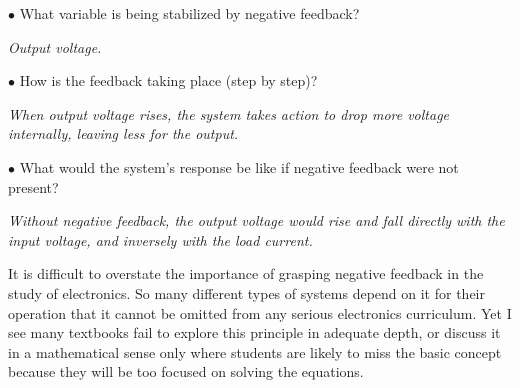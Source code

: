 \medskip
\goodbreak
\item{$\bullet$} What variable is being stabilized by negative feedback? 
\item{ }{\it Output voltage.}
\vskip 5pt
\item{$\bullet$} How is the feedback taking place (step by step)?
\item{ }{\it When output voltage rises, the system takes action to drop more voltage internally, leaving less for the output.}
\vskip 5pt
\item{$\bullet$} What would the system's response be like if negative feedback were not present?
\item{ }{\it Without negative feedback, the output voltage would rise and fall directly with the input voltage, and inversely with the load current.}
\medskip







It is difficult to overstate the importance of grasping negative feedback in the study of electronics.  So many different types of systems depend on it for their operation that it cannot be omitted from any serious electronics curriculum.  Yet I see many textbooks fail to explore this principle in adequate depth, or discuss it in a mathematical sense only where students are likely to miss the basic concept because they will be too focused on solving the equations.




